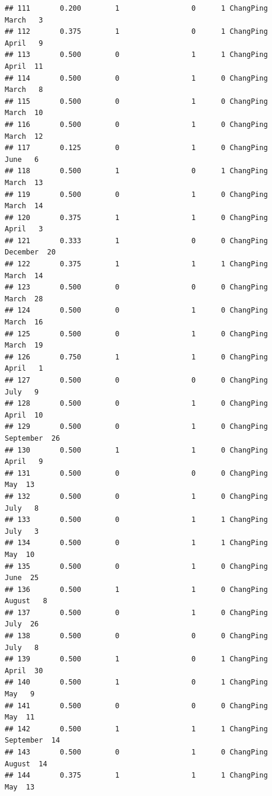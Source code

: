 \documentclass[
]{article}
\begin{document}
\begin{verbatim}
## 111       0.200        1                 0      1 ChangPing     March   3
## 112       0.375        1                 0      1 ChangPing     April   9
## 113       0.500        0                 1      1 ChangPing     April  11
## 114       0.500        0                 1      0 ChangPing     March   8
## 115       0.500        0                 1      0 ChangPing     March  10
## 116       0.500        0                 1      0 ChangPing     March  12
## 117       0.125        0                 1      0 ChangPing      June   6
## 118       0.500        1                 0      1 ChangPing     March  13
## 119       0.500        0                 1      0 ChangPing     March  14
## 120       0.375        1                 1      0 ChangPing     April   3
## 121       0.333        1                 0      0 ChangPing  December  20
## 122       0.375        1                 1      1 ChangPing     March  14
## 123       0.500        0                 0      0 ChangPing     March  28
## 124       0.500        0                 1      0 ChangPing     March  16
## 125       0.500        0                 1      0 ChangPing     March  19
## 126       0.750        1                 1      0 ChangPing     April   1
## 127       0.500        0                 0      0 ChangPing      July   9
## 128       0.500        0                 1      0 ChangPing     April  10
## 129       0.500        0                 1      0 ChangPing September  26
## 130       0.500        1                 1      0 ChangPing     April   9
## 131       0.500        0                 0      0 ChangPing       May  13
## 132       0.500        0                 1      0 ChangPing      July   8
## 133       0.500        0                 1      1 ChangPing      July   3
## 134       0.500        0                 1      1 ChangPing       May  10
## 135       0.500        0                 1      0 ChangPing      June  25
## 136       0.500        1                 1      0 ChangPing    August   8
## 137       0.500        0                 1      0 ChangPing      July  26
## 138       0.500        0                 0      0 ChangPing      July   8
## 139       0.500        1                 0      1 ChangPing     April  30
## 140       0.500        1                 0      1 ChangPing       May   9
## 141       0.500        0                 0      0 ChangPing       May  11
## 142       0.500        1                 1      1 ChangPing September  14
## 143       0.500        0                 1      0 ChangPing    August  14
## 144       0.375        1                 1      1 ChangPing       May  13

\end{verbatim}
\end{document}
